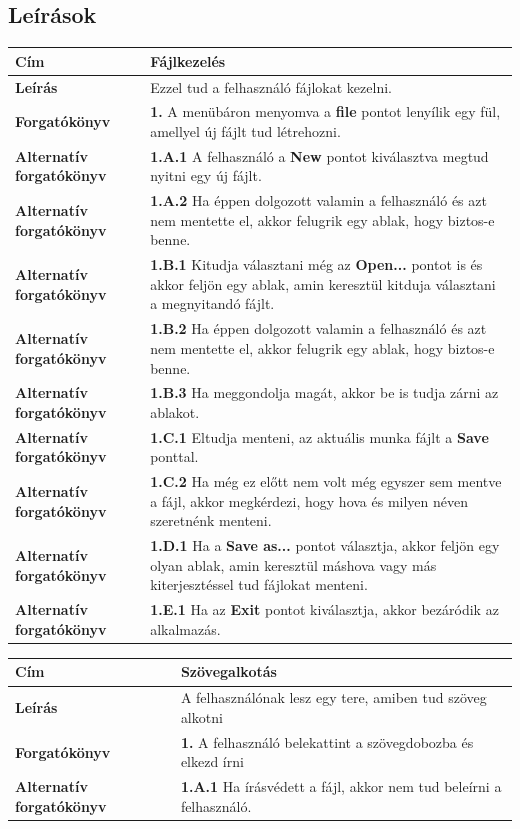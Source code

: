 \documentclass[12pt]{article}
\begin{document}
\subsection*{Leírások}
\begin{longtable}[h]{|p{5cm}|p{10cm}|}
  \hline
  \textbf{Cím} & \textbf{Fájlkezelés} \\ \hline
  \textbf{Leírás} & Ezzel tud a felhasználó fájlokat kezelni. \\ \hline
  \textbf{Forgatókönyv} & \textbf{1.} A menübáron menyomva a \textbf{file} pontot
  lenyílik egy fül, amellyel új fájlt tud létrehozni. \\ \hline
  \textbf{Alternatív forgatókönyv} & \textbf{1.A.1} A felhasználó a \textbf{New}
  pontot kiválasztva megtud nyitni egy új fájlt.\\ \hline
  \textbf{Alternatív forgatókönyv} & \textbf{1.A.2} Ha éppen dolgozott valamin a
  felhasználó és azt nem mentette el, akkor felugrik egy ablak, hogy biztos-e
  benne. \\ \hline
  \textbf{Alternatív forgatókönyv} & \textbf{1.B.1} Kitudja választani még az
  \textbf{Open...} pontot is és akkor feljön egy ablak, amin keresztül kitduja
  választani a megnyitandó fájlt. \\ \hline
  \textbf{Alternatív forgatókönyv} & \textbf{1.B.2} Ha éppen dolgozott valamin a
  felhasználó és azt nem mentette el, akkor felugrik egy ablak, hogy biztos-e
  benne. \\ \hline
  \textbf{Alternatív forgatókönyv} & \textbf{1.B.3} Ha meggondolja magát, akkor be
  is tudja zárni az ablakot. \\ \hline
  \textbf{Alternatív forgatókönyv} & \textbf{1.C.1} Eltudja menteni, az aktuális
  munka fájlt a \textbf{Save} ponttal. \\ \hline
  \textbf{Alternatív forgatókönyv} & \textbf{1.C.2} Ha még ez előtt nem volt
  még egyszer sem mentve a fájl, akkor megkérdezi, hogy hova és milyen néven
  szeretnénk menteni. \\ \hline
  \textbf{Alternatív forgatókönyv} & \textbf{1.D.1} Ha a \textbf{Save as...} pontot
  választja, akkor feljön egy olyan ablak, amin keresztül máshova vagy más kiterjesztéssel
  tud fájlokat menteni. \\ \hline
  \textbf{Alternatív forgatókönyv} & \textbf{1.E.1} Ha az \textbf{Exit} pontot
  kiválasztja, akkor bezáródik az alkalmazás. \\ \hline
\end{longtable}

\begin{longtable}[h]{|p{5cm}|p{10cm}|}
  \hline
  \textbf{Cím} & \textbf{Szövegalkotás} \\ \hline
  \textbf{Leírás} & A felhasználónak lesz egy tere, amiben tud szöveg alkotni \\ \hline
  \textbf{Forgatókönyv} & \textbf{1.} A felhasználó belekattint a szövegdobozba
  és elkezd írni \\ \hline
  \textbf{Alternatív forgatókönyv} & \textbf{1.A.1} Ha írásvédett a fájl, akkor
  nem tud beleírni a felhasználó. \\ \hline
\end{longtable}
\end{document}
